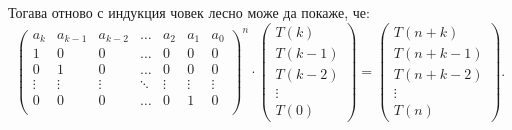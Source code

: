 Тогава отново с индукция човек лесно може да покаже, че:
\[
    \begin{pmatrix}
        a_k    & a_{k - 1} & a_{k - 2} & \dots  & a_2    & a_1    & a_0    \\
        1      & 0         & 0         & \dots  & 0      & 0      & 0      \\
        0      & 1         & 0         & \dots  & 0      & 0      & 0      \\
        \vdots & \vdots    & \vdots    & \ddots & \vdots & \vdots & \vdots \\
        0      & 0         & 0         & \dots  & 0      & 1      & 0      \\
    \end{pmatrix}^n
    \cdot
    \begin{pmatrix}
        T(k)     \\
        T(k - 1) \\
        T(k - 2) \\
        \vdots   \\
        T(0)
    \end{pmatrix}
    =
    \begin{pmatrix}
        T(n + k)     \\
        T(n + k - 1) \\
        T(n + k - 2) \\
        \vdots       \\
        T(n)
    \end{pmatrix}.
\]

\newpage